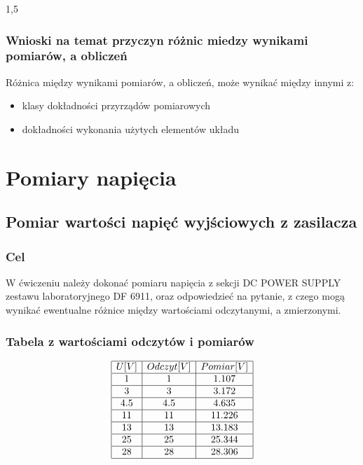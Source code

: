 \documentclass[polish,polish,a4paper]{article}
\begin{document}
\begin{spacing}{1,5}
		\subsubsection*{Wnioski na temat przyczyn różnic miedzy wynikami pomiarów, a obliczeń}
		
		Różnica między wynikami pomiarów, a obliczeń, może wynikać między innymi z:
		\begin{itemize}
			\item klasy dokładności przyrządów pomiarowych
			\item dokładności wykonania użytych elementów układu
		\end{itemize}
		
		
		
		\section{Pomiary napięcia}
		\subsection{Pomiar wartości napięć wyjściowych z zasilacza}
		
		\subsubsection*{Cel}
		W ćwiczeniu należy dokonać pomiaru napięcia z sekcji DC POWER SUPPLY zestawu laboratoryjnego DF
		6911, oraz odpowiedzieć na pytanie, z czego mogą wynikać ewentualne różnice między wartościami odczytanymi, a zmierzonymi.
		
		\subsubsection*{Tabela z wartościami odczytów i pomiarów}
		
		
		\[
		\begin{array}{|c|c|c|}
		\hline
		U [V]&Odczyt [V]& Pomiar [V]\\
		\hline
		1&1&1.107\\
		\hline
		3&3&3.172\\
		\hline
		4.5&4.5&4.635\\
		\hline
		11&11&11.226\\
		\hline
		13&13&13.183\\
		\hline
		25&25&25.344\\
		\hline
		28&28&28.306\\
		\hline
		\end{array}
		\]
		

\end{spacing}
\end{document}
